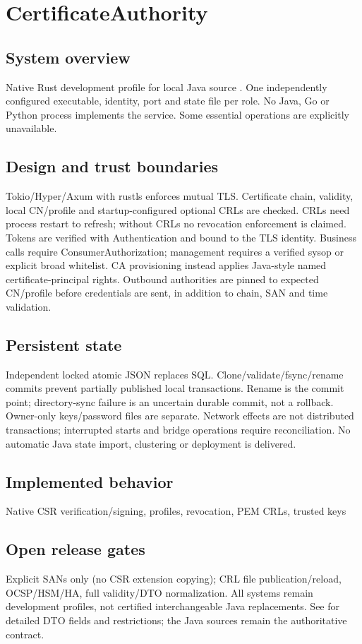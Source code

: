 \documentclass[a4paper]{arrowhead}
\begin{document}
\section{CertificateAuthority}
\subsection{System overview}
Native Rust development profile for local Java source . One independently configured executable, identity, port and state file per role. No Java, Go or Python process implements the service. Some essential operations are explicitly unavailable.
\subsection{Design and trust boundaries}
Tokio/Hyper/Axum with rustls enforces mutual TLS. Certificate chain, validity, local CN/profile and startup-configured optional CRLs are checked. CRLs need process restart to refresh; without CRLs no revocation enforcement is claimed. Tokens are verified with Authentication and bound to the TLS identity. Business calls require ConsumerAuthorization; management requires a verified sysop or explicit broad whitelist. CA provisioning instead applies Java-style named certificate-principal rights. Outbound authorities are pinned to expected CN/profile before credentials are sent, in addition to chain, SAN and time validation.
\subsection{Persistent state}
Independent locked atomic JSON replaces SQL. Clone/validate/fsync/rename commits prevent partially published local transactions. Rename is the commit point; directory-sync failure is an uncertain durable commit, not a rollback. Owner-only keys/password files are separate. Network effects are not distributed transactions; interrupted starts and bridge operations require reconciliation. No automatic Java state import, clustering or deployment is delivered.
\subsection{Implemented behavior}
Native CSR verification/signing, profiles, revocation, PEM CRLs, trusted keys
\subsection{Open release gates}
Explicit SANs only (no CSR extension copying); CRL file publication/reload, OCSP/HSM/HA, full validity/DTO normalization. All systems remain development profiles, not certified interchangeable Java replacements. See  for detailed DTO fields and restrictions; the Java sources remain the authoritative contract.
\end{document}
